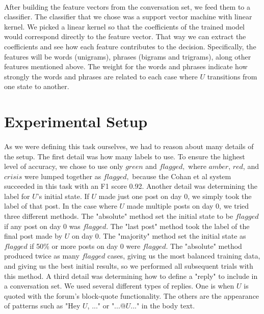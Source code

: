 \documentclass{article}
\begin{document}
\paragraph{}After building the feature vectors from the conversation set, we feed them to a classifier. The classifier that we chose was a support vector machine with linear kernel. We picked a linear kernel so that the coefficients of the trained model would correspond directly to the feature vector. That way we can extract the coefficients and see how each feature contributes to the decision. Specifically, the features will be words (unigrams), phrases (bigrams and trigrams), along other features mentioned above. The weight for the words and phrases indicate how strongly the words and phrases are related to each case where $U$ transitions from one state to another. 

\section{Experimental Setup}

\paragraph{}As we were defining this task ourselves, we had to reason about many details of the setup. The first detail was how many labels to use. To ensure the highest level of accuracy, we chose to use only $green$ and $flagged,$ where $amber$, $red$, and $crisis$ were lumped together as $flagged,$ because the Cohan et al system succeeded in this task with an F1 score 0.92. Another detail was determining the label for $U$'s initial state. If $U$ made just one post on day 0, we simply took the label of that post. In the case where $U$ made multiple posts on day 0, we tried three different methods. The "absolute" method set the initial state to be $flagged$ if any post on day 0 was $flagged$. The "last post" method took the label of the final post made by $U$ on day 0. The "majority" method set the initial state as $flagged$ if 50\% or more posts on day 0 were $flagged$. The "absolute" method produced twice as many $flagged$ cases, giving us the most balanced training data, and giving us the best initial results, so we performed all subsequent trials with this method. A third detail was determining how to define a "reply" to include in a conversation set. We used several different types of replies. One is when $U$ is quoted with the forum's block-quote functionality. The others are the appearance of patterns such as "Hey $U$, ..." or "...@$U$..." in the body text.
\end{document}
